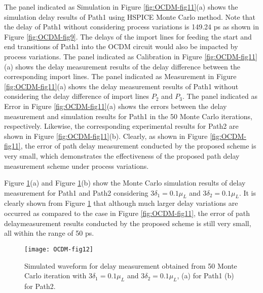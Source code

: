 The panel indicated as Simulation in Figure \ref{fig:OCDM-fig11}(a) shows the simulation delay results of Path1 using HSPICE Monte Carlo method. Note that the delay of Path1 without considering process variations is 149.24 ps as shown in Figure \ref{fig:OCDM-fig9}. The delays of the import lines for feeding the start and end transitions of Path1 into the OCDM circuit would also be impacted by process variations. The panel indicated as Calibration in Figure \ref{fig:OCDM-fig11}(a) shows the delay measurement results of the delay difference between the corresponding import lines. The panel indicated as Measurement in Figure \ref{fig:OCDM-fig11}(a) shows the delay measurement results of Path1 without considering the delay difference of import lines $P_{2}$ and $P_{3}$. The panel indicated as Error in Figure \ref{fig:OCDM-fig11}(a) shows the errors between the delay measurement and simulation results for Path1 in the 50 Monte Carlo iterations, respectively. Likewise, the corresponding experimental results for Path2 are shown in Figure \ref{fig:OCDM-fig11}(b). Clearly, as shown in Figure \ref{fig:OCDM-fig11}, the error of path delay measurement conducted by the proposed scheme is very small, which demonstrates the effectiveness of the proposed path delay measurement scheme under process variations.


Figure \ref{fig:OCDM-fig12}(a) and Figure \ref{fig:OCDM-fig12}(b) show the Monte Carlo simulation results of delay measurement for Path1 and Path2 considering $3\delta_{1}=0.1\mu_{L}$ and $3\delta_{2}=0.1\mu_{L}$. It is clearly shown from Figure \ref{fig:OCDM-fig12} that although much larger delay variations are occurred as compared to the case in Figure \ref{fig:OCDM-fig11}, the error of path delaymeasurement results conducted by the proposed scheme is still very small, all within
the range of 50 ps.

\begin{figure}[t]
\centering
\texttt{[image: OCDM-fig12]}
    \caption{Simulated waveform for delay measurement obtained from 50 Monte Carlo iteration with $3\delta_{1}=0.1\mu_{L}$ and $3\delta_{2}=0.1\mu_{L}$, (a) for Path1 (b) for Path2.}
    \label{fig:OCDM-fig12}
\end{figure}


